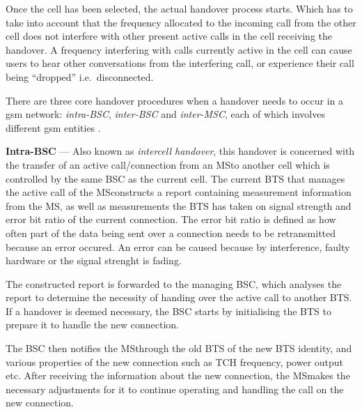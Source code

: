 Once the cell has been selected, the actual handover process starts. Which has to take into account that the frequency allocated to the incoming call from the other cell does not interfere with other present active calls in the cell receiving the handover\cite{Eisenblatter,GSMArchitectureProtocolsServices,wirelesstelcoMullet}. A frequency interfering with calls currently active in the cell can cause users to hear other conversations from the interfering call, or experience their call being ``dropped'' i.e.\ disconnected\cite{Eisenblatter}. 

There are three core handover procedures when a handover needs to occur in a \gls{gsm} network: \emph{intra-BSC}, \emph{inter-BSC} and \emph{inter-MSC}, each of which involves different \gls{gsm} entities \cite{wirelesstelcoMullet}.

\begin{description}
\item{\textbf{Intra-BSC}} --- Also known as \emph{intercell handover}, this handover is concerned with the transfer of an active call/connection from an \gls{MS}to another cell which is controlled by the same BSC as the current cell\cite{wirelesstelcoMullet,GSMArchitectureProtocolsServices}. The current BTS that manages the active call of the \gls{MS}constructs a report containing measurement information from the MS, as well as measurements the BTS has taken on signal strength and error bit ratio of the current connection\cite{wirelesstelcoMullet,GSMArchitectureProtocolsServices}. The error bit ratio is defined as how often part of the data being sent over a connection needs to be retransmitted because an error occured\cite{wirelesstelcoMullet,GSMArchitectureProtocolsServices}. An error can be caused because by interference, faulty hardware or the signal strenght is fading\cite{wirelesstelcoMullet,GSMArchitectureProtocolsServices}. 

The constructed report is forwarded to the managing BSC, which analyses the report to determine the necessity of handing over the active call to another BTS\@. If a handover is deemed necessary, the BSC starts by initialising the BTS to prepare it to handle the new connection\cite{wirelesstelcoMullet,GSMArchitectureProtocolsServices}.

The BSC then notifies the \gls{MS}through the old BTS of the new BTS identity, and various properties of the new connection such as TCH frequency, power output etc. After receiving the information about the new connection, the \gls{MS}makes the necessary adjustments for it to continue operating and handling the call on the new connection\cite{wirelesstelcoMullet,GSMArchitectureProtocolsServices}. 


\end{description}
